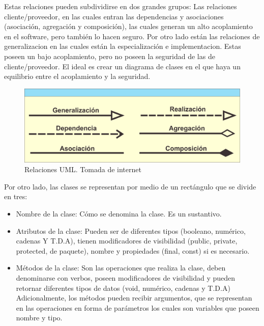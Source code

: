 Estas relaciones pueden subdividirse en dos grandes grupos: Las relaciones cliente/proveedor, en las cuales entran las dependencias y asociaciones (asociación, agregación y composición), las cuales generan un alto acoplamiento en el software, pero también lo hacen seguro. Por otro lado están las relaciones de generalizacion en las cuales están la especialización e implementacion. Estas poseen un bajo acoplamiento, pero no poseen la seguridad de las de cliente/proveedor. 
El ideal es crear un diagrama de clases en el que haya un equilibrio entre el acoplamiento y la seguridad.
\begin{figure}[H]
	\centering
	\includegraphics[width=1\linewidth]{diseno/clases/imagenes/relaciones.png}
	\caption{Relaciones UML. Tomada de internet}
	\label{fig:gantt}
\end{figure}
Por otro lado, las clases se representan por medio de un rectángulo que se divide en tres:
\begin{itemize}
\item Nombre de la clase: Cómo se denomina la clase. Es un sustantivo.
\item Atributos de la clase: Pueden ser de diferentes tipos (booleano, numérico, cadenas Y T.D.A), tienen modificadores de visibilidad (public, private, protected, de paquete), nombre y propiedades (final, const) si es necesario.
\item Métodos de la clase: Son las operaciones que realiza la clase, deben denominarse con verbos, poseen modificadores de visibilidad y pueden retornar diferentes tipos de datos (void, numérico, cadenas y T.D.A) Adicionalmente, los métodos pueden recibir argumentos, que se representan en las operaciones en forma de parámetros los cuales son variables que poseen nombre y tipo.
\end{itemize}
 